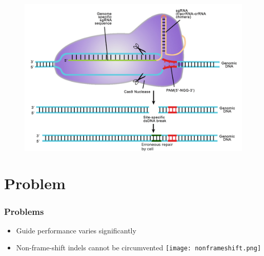 \documentclass[Nike]{tuberlinbeamer}
\begin{document}
\begin{frame}
  \begin{figure}
    \includegraphics[width=0.85\linewidth,left]{Doudna-art-crop-repair.jpg}
  \end{figure}
\end{frame}


\section{Problem}


\begin{frame}
  \frametitle{Problems}
  \begin{itemize}
    \item Guide performance varies significantly
    \pause
      \vspace{0.1cm}
    \item Non-frame-shift indels cannot be circumvented
      \texttt{[image: nonframeshift.png]}
  \end{itemize}
\end{frame}
\end{document}
